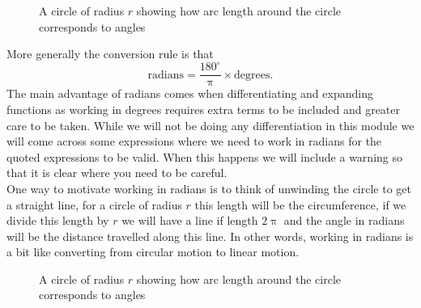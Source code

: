 \begin{figure}[ht]
    \centering
    \caption{A circle of radius $r$ showing how arc length around the circle corresponds to angles}
        \label{fig: radians}
\end{figure}

More generally the conversion rule is that
\begin{equation*}
\text{radians} = \frac{180^{\circ}}{\uppi}\times \text{degrees}.
\end{equation*}
The main advantage of radians comes when differentiating and expanding functions as working in degrees requires extra terms to be included and greater care to be taken. While we will not be doing any differentiation in this module we will come across some expressions where we need to work in radians for the quoted expressions to be valid. When this happens we will include a warning so that it is clear where you need to be careful.\\

One way to motivate working in radians is to think of unwinding the circle to get a straight line, for a circle of radius $r$ this length will be the circumference, if we divide this length by $r$ we will have a line if length $2\uppi$ and the angle in radians will be the distance travelled along this line. In other words, working in radians is a bit like converting from circular motion to linear motion.

\begin{figure}[ht]
    \centering
    \caption{A circle of radius $r$ showing how arc length around the circle corresponds to angles}
        \label{fig: radians 2}
\end{figure}

